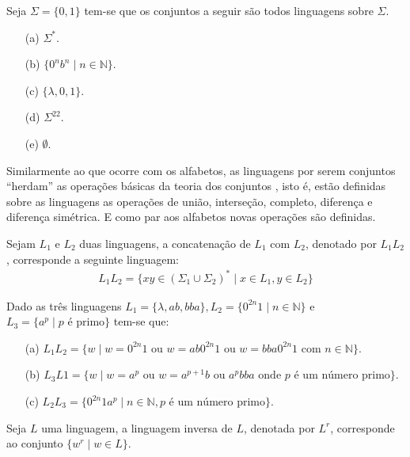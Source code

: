 \begin{example}
	Seja $\Sigma = \{0, 1\}$ tem-se que os conjuntos a seguir são todos linguagens sobre $\Sigma$.
	\begin{itemize}
		\item[(a)] $\Sigma^*$.
		\item[(b)] $\{0^nb^n \mid n \in \mathbb{N}\}$.
		\item[(c)] $\{\lambda, 0, 1\}$.
		\item[(d)] $\Sigma^{22}$.
		\item[(e)] $\emptyset$.
	\end{itemize}
\end{example}

Similarmente ao que ocorre com os alfabetos, as linguagens por serem conjuntos ``herdam'' as operações básicas da teoria dos conjuntos \cite{lipschutz1978-TC, lipschutz2013-MD, abe1991-TC}, isto é, estão definidas sobre as linguagens as operações de união, interseção, completo, diferença e diferença simétrica. E como par aos alfabetos novas operações são definidas.

\begin{definition}\label{def:ConcatenacaoLinguagem}
	Sejam $L_1$ e $L_2$ duas linguagens, a concatenação de $L_1$ com $L_2$, denotado por $L_1L_2$, corresponde a seguinte linguagem:
	\begin{eqnarray}
		L_1L_2 = \{xy \in (\Sigma_1 \cup \Sigma_2)^* \mid x \in L_1, y \in L_2\}
	\end{eqnarray}
\end{definition}

\begin{example}\label{exe:ConcatenacaoLinguagem} 
	Dado as três linguagens $L_1 = \{\lambda, ab, bba\}, L_2 =\{0^{2n}1 \mid n \in \mathbb{N}\}$ e $L_3 = \{a^p \mid p \text{ é primo}\}$ tem-se que:
	\begin{itemize}
		\item[(a)] $L_1L_2 = \{w \mid w = 0^{2n}1 \text{ ou } w = ab0^{2n}1 \text{ ou } w = bba0^{2n}1 \text{ com } n \in \mathbb{N}\}$.
		\item[(b)] $L_3L1 = \{w \mid w = a^p \text{ ou } w = a^{p+1}b \text{ ou } a^pbba \text{ onde } p \text{ é um número primo}\}$.
		\item[(c)] $L_2L_3 = \{0^{2n}1a^p \mid n \in \mathbb{N}, p \text{ é um número primo}\}$.
	\end{itemize}
\end{example}

\begin{definition}\label{def:LinguagemReversa}
	Seja $L$ uma linguagem, a linguagem inversa de $L$, denotada por $L^r$, corresponde ao conjunto $\{w^r \mid w \in L\}$.
\end{definition}

